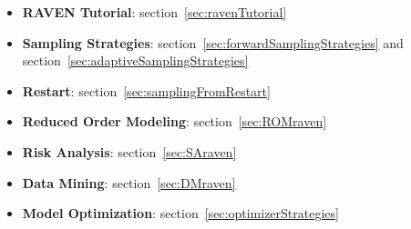 \begin{itemize}
  \item \textbf{RAVEN Tutorial}: section~\ref{sec:ravenTutorial}
  \item \textbf{Sampling Strategies}: section~\ref{sec:forwardSamplingStrategies} and section~\ref{sec:adaptiveSamplingStrategies}
  \item \textbf{Restart}: section~\ref{sec:samplingFromRestart}
  \item \textbf{Reduced Order Modeling}: section~\ref{sec:ROMraven}
  \item \textbf{Risk Analysis}: section~\ref{sec:SAraven}
  \item \textbf{Data Mining}: section~\ref{sec:DMraven}
  \item \textbf{Model Optimization}: section~\ref{sec:optimizerStrategies}
\end{itemize}



